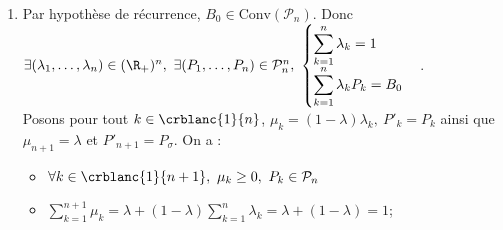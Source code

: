 \documentclass{book}
\begin{document}
\begin{enumerate}[leftmargin=*]
\begin{enumerate}[label=\alph*.]
\begin{align*}
				&\geq\sum_{i\in I}\sum_{j\in A_I}B_{ij}\\
				(\text{par définition de }A_I)\ &=\sum_{i\in I}\sum_{j=1}^nB_{ij}\\
				&=\sum_{i\in I}1\\
				&=\Card(I)
			\end{align*}
			Alors d'après le théorème de Hall (cf.\ref{Théorème de Hall}), $\exists (j_1,\dots,j_n)\in \displaystyle\prod_{i=1}^nA_i,\ \forall (k,l)\in \crblanc{1}{n}^2,\ (k\ne l\implies j_k\ne j_l)$.\\
			Posons $\fonction{\sigma}{\crblanc{1}{n}}{\crblanc{1}{n}}{k}{j_k}$. $\sigma\in S_n$ puisqu'elle est injective par construction.\\
			On pose aussi $\lambda=\min\left\{B_{ij},\ j\in \displaystyle\bigcup_{i=1}^nA_i\right\}$. $\lambda<1$ car sinon on aurait $m=n$.\\
			Enfin, posons $B_0=\displaystyle\frac{1}{\lambda}(B-P_\sigma)$.\\
			Le choix de $\lambda$ garantit que $B_0\in \M_n(\R_+)$ et $\forall i\in \crblanc{1}{n}$,\\
			$\displaystyle\sum_{j=1}^n(B_0)_{ij}=\frac{1}{1-\lambda}\left(\sum_{j=1}^nB_{ij}-\lambda\sum_{j=1}^n(P_\sigma)_{ij}\right)=\frac{1}{1-\lambda}(1-\lambda)=1$. Ainsi $B_0\in \B_n$.\\
			De plus, en notant $j_0$ un indice tel que $B_{ij_0}=\lambda$, on remarque que $(B_0)_{ij_0}=0$ alors que $B_{ij_0}\ne 0$ par définition des $A_i$.\\
			$B_0$ est donc bien une matrice bistochastique ayant au moins un coefficient nul de plus que $B$.
		\end{enumerate}
		\item Par hypothèse de récurrence, $B_0\in \text{Conv}(\mathcal P_n)$. Donc $\exists (\lambda_1,\dots,\lambda_n)\in (\R_+)^n,\ \exists (P_1,\dots,P_n)\in \mathcal P_n^n,\ \begin{cases}
			\displaystyle\sum_{k=1}^n\lambda_k=1\\        \displaystyle\sum_{k=1}^n\lambda_kP_k=B_0
		\end{cases}$.\\
		Posons pour tout $k\in \crblanc{1}{n}$, $\mu_k=(1-\lambda)\lambda_k,\ P'_k=P_k$ ainsi que $\mu_{n+1}=\lambda$ et $P'_{n+1}=P_\sigma$. On a :\\
		\begin{itemize}
			\item $\forall k\in \crblanc{1}{n+1},\ \mu_k\geq 0,\ P_k\in \mathcal P_n$
			\item $\displaystyle\sum_{k=1}^{n+1}\mu_k=\lambda+(1-\lambda)\sum_{k=1}^n\lambda_k=\lambda+(1-\lambda)=1$;

\end{itemize}
\end{enumerate}
\end{document}
